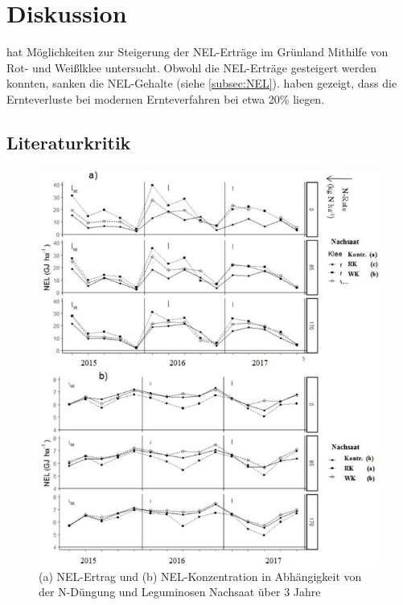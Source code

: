 
\section{Diskussion}
\label{sec:Disukussion}
\textcite[33-36]{weggler2050leguminosen} hat Möglichkeiten zur Steigerung der \ac{NEL}-Erträge im Grünland Mithilfe von Rot- und Weißlklee untersucht.
Obwohl die \ac{NEL}-Erträge gesteigert werden konnten, sanken die \ac{NEL}-Gehalte (siehe \cref{subsec:NEL}).
\textcite{fritz2018wirtschaftliche} haben gezeigt, dass die Ernteverluste bei modernen Ernteverfahren bei etwa 20\% liegen.


\subsection{Literaturkritik}
\label{sub:kritik}

\begin{figure}
	\includegraphics[scale=0.75]{images/wegglerAbb1}
	\caption[(a) \acs{NEL}-Ertrag und (b) \acs{NEL}-Konzentration in Abhängigkeit von der N-Düngung und Leguminosen Nachsaat über 3 Jahre]{(a) \ac{NEL}-Ertrag und (b) \ac{NEL}-Konzentration in Abhängigkeit von der N-Düngung und Leguminosen Nachsaat über 3 Jahre \parencite[35]{weggler2050leguminosen}}
	\label{fig:wegglerAbb1}
\end{figure}

